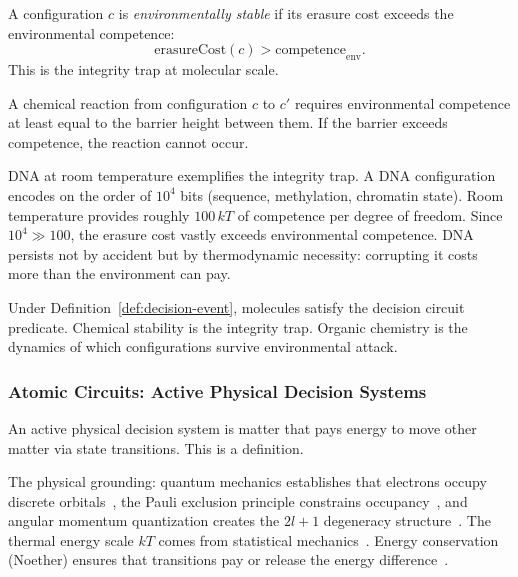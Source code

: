 \begin{definition}\label{def:environmental-stability}
A configuration $c$ is \emph{environmentally stable} if its erasure cost exceeds the environmental competence:
\[
\text{erasureCost}(c) > \text{competence}_{\text{env}}.
\]
This is the integrity trap at molecular scale.
\end{definition}

\begin{proposition}\label{prop:reaction-competence}
A chemical reaction from configuration $c$ to $c'$ requires environmental competence at least equal to the barrier height between them. If the barrier exceeds competence, the reaction cannot occur.
\end{proposition}

\begin{example}\label{ex:dna-persistence}
DNA at room temperature exemplifies the integrity trap. A DNA configuration encodes on the order of $10^4$ bits (sequence, methylation, chromatin state). Room temperature provides roughly $100\,kT$ of competence per degree of freedom. Since $10^4 \gg 100$, the erasure cost vastly exceeds environmental competence. DNA persists not by accident but by thermodynamic necessity: corrupting it costs more than the environment can pay.
\end{example}

Under Definition~\ref{def:decision-event}, molecules satisfy the decision circuit predicate. Chemical stability is the integrity trap. Organic chemistry is the dynamics of which configurations survive environmental attack.

\subsubsection{Atomic Circuits: Active Physical Decision Systems}\label{sec:atomic-circuits}

An active physical decision system is matter that pays energy to move other matter via state transitions. This is a definition.

The physical grounding: quantum mechanics establishes that electrons occupy discrete orbitals~\cite{schrodinger1926undulatory,sakurai2017modern}, the Pauli exclusion principle constrains occupancy~\cite{pauli1925zusammenhang}, and angular momentum quantization creates the $2l+1$ degeneracy structure~\cite{sakurai2017modern}. The thermal energy scale $kT$ comes from statistical mechanics~\cite{boltzmann1877beziehung,kittel1980thermal}. Energy conservation (Noether) ensures that transitions pay or release the energy difference~\cite{noether1918invariante}.

